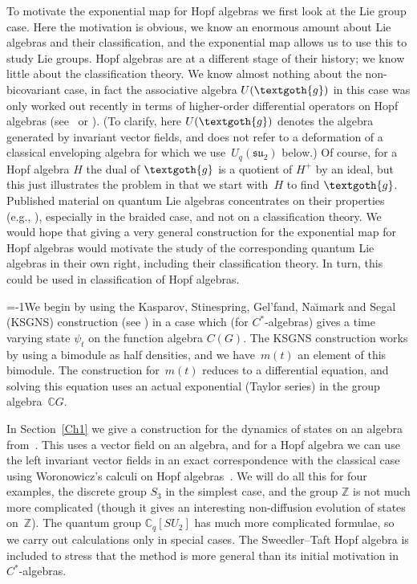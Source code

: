 \documentclass[pdftex]{sigma}
\numberwithin{equation}{section}
\newcommand{\C}{\mathbb{C}}
\newcommand{\Z}{\mathbb{Z}}
\newcommand{\<}{\langle}
\renewcommand{\>}{\rangle}
\begin{document}
To motivate the exponential map for Hopf algebras we first look at the Lie group case. Here the motivation is obvious, we know an enormous amount about Lie algebras and their classification, and the exponential map allows us to use this to study Lie groups. Hopf algebras are at a different stage of their history; we know little about the classification theory. We know almost nothing about the non-bicovariant case, in fact the associative algebra $ U(\textgoth{g}) $ in this case was only worked out recently in terms of higher-order differential operators on Hopf algebras (see~\cite{Bgeholom} or \cite[p.~515]{BMbook}). (To clarify, here $U(\textgoth{g})$ denotes the algebra generated by invariant vector fields, and does not refer to a deformation of a classical enveloping algebra for which we use~$ U_{q}({\mathfrak{su}}_{2}) $ below.) Of course, for a Hopf algebra $ H $ the dual of $\textgoth{g}$ is a quotient of $ H^{+} $ by an ideal, but this just illustrates the problem in that we start with~$ H $ to find $\textgoth{g}$. Published material on quantum Lie algebras concentrates on their properties (e.g., \cite{GomMa:blie,Ma:blie}), especially in the braided case, and not on a classification theory. We would hope that giving a very general construction for the exponential map for Hopf algebras would motivate the study of the corresponding quantum Lie algebras in their own right, including their classification theory. In turn, this could be used in classification of Hopf algebras.

\looseness=-1We begin by using the Kasparov, Stinespring, Gel'fand, Na\u{\i}mark and Segal (KSGNS) construction (see \cite{Lance}) in a case which (for $ C^{*}$-algebras) gives a time varying state $ \psi_{t} $ on the function algebra $ C(G) $. The KSGNS construction works by using a bimodule as half densities, and we have~$ m(t) $ an element of this bimodule. The construction for~$ m(t) $ reduces to a differential equation, and solving this equation uses an actual exponential (Taylor series) in the group algebra~$ \C G $.

In Section~\ref{Ch1} we give a construction for the dynamics of states on an algebra from~\cite{Bgeo}. This uses a vector field on an algebra, and for a Hopf algebra we can use the left invariant vector fields in an exact correspondence with the classical case using Woronowicz's calculi on Hopf algebras~\cite{WoroMatl}. We will do all this for four examples, the discrete group $ S_{3} $ in the simplest case, and the group $ \Z $ is not much more complicated (though it gives an interesting non-diffusion evolution of states on~$ \Z $). The quantum group $ \C_{q}[SU_{2}] $ has much more complicated formulae, so we carry out calculations only in special cases. The Sweedler--Taft Hopf algebra is included to stress that the method is more general than its initial motivation in $ C^{*} $-algebras.
\end{document}
